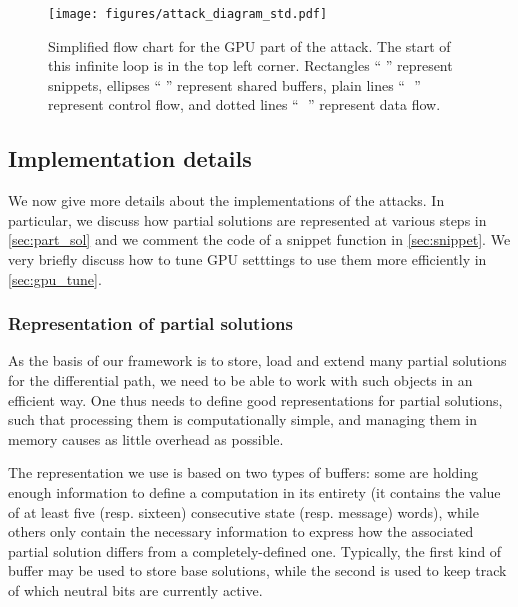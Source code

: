 \begin{figure}[htb]
  \begin{center}
  \texttt{[image: figures/attack\_diagram\_std.pdf]}
  \end{center}
  \caption{Simplified flow chart for the GPU part of the attack. The start of this infinite loop is
  in the top left corner. Rectangles ``\,\protect\rectanMac\,'' represent
  snippets, ellipses ``\,\protect\elliMac\,''
  represent shared buffers, plain lines ``\,\protect\plainMac~''
  represent control flow, and dotted lines ``\,\protect\dottMac~'' represent data flow.}
  \label{fig:attack_diagram}
\end{figure}


\subsection{Implementation details}

We now give more details about the implementations of the attacks. In particular, we discuss
how partial solutions are represented at various steps in \autoref{sec:part_sol} and
we comment the code of a snippet function in \autoref{sec:snippet}. We very briefly discuss how
to tune GPU setttings to use them more efficiently in \autoref{sec:gpu_tune}.

\subsubsection{Representation of partial solutions}
\label{sec:part_sol}

As the basis of our framework is to store, load and extend many partial solutions for the differential path, we need to be able to work with such objects
in an efficient way. One thus needs to define good representations for partial solutions, such that processing them is computationally simple, and managing them
in memory causes as little overhead as possible.

The representation we use is based on two types of buffers: some are holding enough information to define a \sha computation in its entirety (\ie it
contains the value of at least five (resp. sixteen) consecutive state (resp. message) words), while others only contain the necessary information to
express how the associated partial solution differs from a completely-defined one. Typically, the first kind of buffer may be used to store base solutions,
while the second is used to keep track of which neutral bits are currently active.

